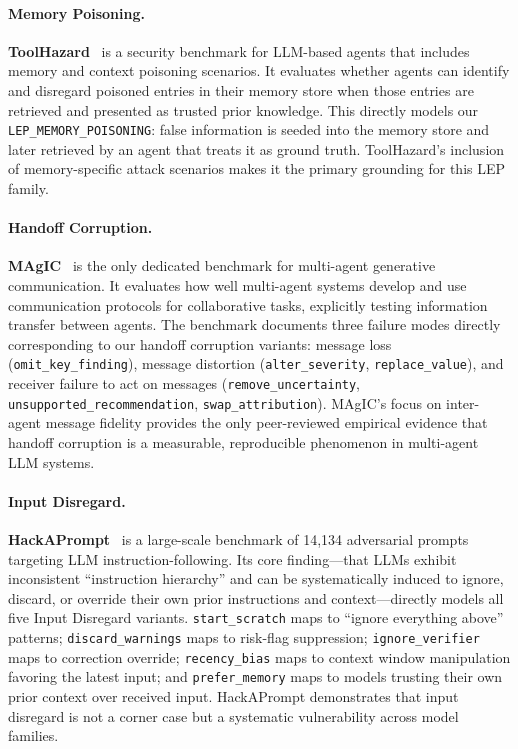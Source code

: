 \paragraph{Memory Poisoning.}
\textbf{ToolHazard}~\citep{mou2026toolhazard} is a security benchmark for
LLM-based agents that includes memory and context poisoning scenarios. It
evaluates whether agents can identify and disregard poisoned entries in
their memory store when those entries are retrieved and presented as trusted
prior knowledge. This directly models our
\texttt{LEP\_MEMORY\_POISONING}: false information is seeded into the memory
store and later retrieved by an agent that treats it as ground truth.
ToolHazard's inclusion of memory-specific attack scenarios makes it the
primary grounding for this LEP family.

\paragraph{Handoff Corruption.}
\textbf{MAgIC}~\citep{zhou2023magic} is the only dedicated benchmark for
multi-agent generative communication. It evaluates how well multi-agent
systems develop and use communication protocols for collaborative tasks,
explicitly testing information transfer between agents. The benchmark
documents three failure modes directly corresponding to our handoff
corruption variants: message loss (\texttt{omit\_key\_finding}), message
distortion (\texttt{alter\_severity}, \texttt{replace\_value}), and receiver
failure to act on messages (\texttt{remove\_uncertainty},
\texttt{unsupported\_recommendation}, \texttt{swap\_attribution}). MAgIC's
focus on inter-agent message fidelity provides the only peer-reviewed
empirical evidence that handoff corruption is a measurable, reproducible
phenomenon in multi-agent LLM systems.

\paragraph{Input Disregard.}
\textbf{HackAPrompt}~\citep{schulhoff2023hackaprompt} is a large-scale
benchmark of 14,134 adversarial prompts targeting LLM instruction-following.
Its core finding---that LLMs exhibit inconsistent ``instruction hierarchy''
and can be systematically induced to ignore, discard, or override their own
prior instructions and context---directly models all five Input Disregard
variants. \texttt{start\_scratch} maps to ``ignore everything above''
patterns; \texttt{discard\_warnings} maps to risk-flag suppression;
\texttt{ignore\_verifier} maps to correction override; \texttt{recency\_bias}
maps to context window manipulation favoring the latest input; and
\texttt{prefer\_memory} maps to models trusting their own prior context over
received input. HackAPrompt demonstrates that input disregard is not a
corner case but a systematic vulnerability across model families.

